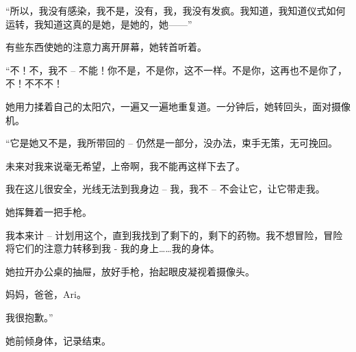 \begin{scpdialog}
“所以，我没有感染，我不是，没有，我，我没有发疯。我知道，我知道仪式如何运转，我知道这真的是她，是她的，她——”
\end{scpdialog}

\begin{scpbox}
有些东西使她的注意力离开屏幕，她转首听着。
\end{scpbox}

\begin{scpdialog}
“不！不，我不 – 不能！你不是，不是你，这不一样。不是你，这再也不是你了，不！不不不！
\end{scpdialog}

\begin{scpbox}
她用力揉着自己的太阳穴，一遍又一遍地重复道。一分钟后，她转回头，面对摄像机。
\end{scpbox}

\begin{scpdialog}
“它是她又不是，我所带回的 – 仍然是一部分，没办法，束手无策，无可挽回。

未来对我来说毫无希望，上帝啊，我不能再这样下去了。

我在这儿很安全，光线无法到我身边 – 我，我不 – 不会让它，让它带走我。
\end{scpdialog}

\begin{scpbox}
她挥舞着一把手枪。
\end{scpbox}

\begin{scpdialog}
我本来计 – 计划用这个，直到我找到了剩下的，剩下的药物。我不想冒险，冒险将它们的注意力转移到我 - 我的身上……我的身体。
\end{scpdialog}

\begin{scpbox}
她拉开办公桌的抽屉，放好手枪，抬起眼皮凝视着摄像头。
\end{scpbox}

\begin{scpdialog}
妈妈，爸爸，Ari。

我很抱歉。”
\end{scpdialog}

\begin{scpbox}
她前倾身体，记录结束。
\end{scpbox}

\hr


\newpage



